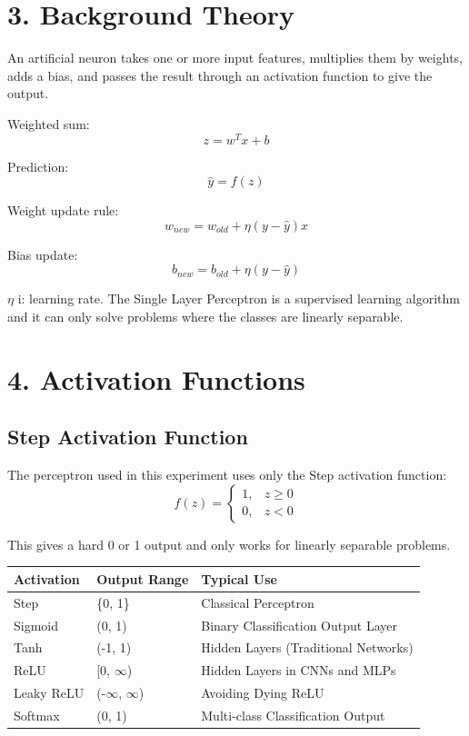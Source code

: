 \documentclass[11pt]{article}
\begin{document}
\section*{3. Background Theory}
An artificial neuron takes one or more input features, multiplies them by weights, adds a bias, and
passes the result through an activation function to give the output.

Weighted sum:
\[
z = w^T x + b
\]

Prediction:
\[
\hat y = f(z)
\]

Weight update rule:
\[
w_{new} = w_{old} + \eta(y - \hat y)x
\]

Bias update:
\[
b_{new} = b_{old} + \eta(y - \hat y)
\]

 $\eta$ i: learning rate. 
 The Single Layer Perceptron is a supervised learning
 algorithm and it can only solve problems where the classes are linearly separable.

\section*{4. Activation Functions}
\subsection*{Step Activation Function}
The perceptron used in this experiment uses only the Step activation function:
\[
f(z) =
\begin{cases}
1, & z \geq 0 \\
0, & z < 0
\end{cases}
\]

This gives a hard 0 or 1 output and only works for linearly separable problems.

\begin{center}
\begin{tabular}{|l|l|l|}
\hline
\textbf{Activation} & \textbf{Output Range} & \textbf{Typical Use} \\ \hline
Step & \{0, 1\} & Classical Perceptron \\ \hline
Sigmoid & (0, 1) & Binary Classification Output Layer \\ \hline
Tanh & (-1, 1) & Hidden Layers (Traditional Networks) \\ \hline
ReLU & [0, $\infty$) & Hidden Layers in CNNs and MLPs \\ \hline
Leaky ReLU & (-$\infty$, $\infty$) & Avoiding Dying ReLU \\ \hline
Softmax & (0, 1) & Multi-class Classification Output \\ \hline
\end{tabular}
\end{center}
\end{document}
